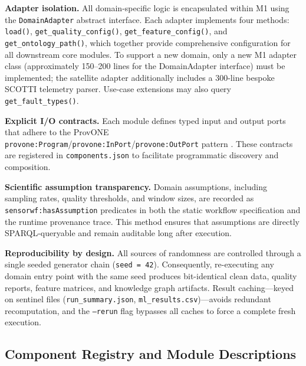 \documentclass[conference]{IEEEtran}
\begin{document}
\textbf{Adapter isolation.} All domain-specific logic is encapsulated within M1 using the \texttt{DomainAdapter} abstract interface. Each adapter implements four methods: \texttt{load()}, \texttt{get\_quality\_config()}, \texttt{get\_feature\_config()}, and \texttt{get\_ontology\_path()}, which together provide comprehensive configuration for all downstream core modules. To support a new domain, only a new M1 adapter class (approximately 150--200 lines for the DomainAdapter interface) must be implemented; the satellite adapter additionally includes a 300-line bespoke SCOTTI telemetry parser. Use-case extensions may also query \texttt{get\_fault\_types()}.

\textbf{Explicit I/O contracts.} Each module defines typed input and output ports that adhere to the ProvONE \texttt{provone:Program}/\texttt{provone:InPort}/\texttt{provone:OutPort} pattern \cite{missier2013provone}. These contracts are registered in \texttt{components.json} to facilitate programmatic discovery and composition.

\textbf{Scientific assumption transparency.} Domain assumptions, including sampling rates, quality thresholds, and window sizes, are recorded as \texttt{sensorwf:hasAssumption} predicates in both the static workflow specification and the runtime provenance trace. This method ensures that assumptions are directly SPARQL-queryable and remain auditable long after execution.

\textbf{Reproducibility by design.} All sources of randomness are controlled through a single seeded generator chain (\texttt{seed = 42}). Consequently, re-executing any domain entry point with the same seed produces bit-identical clean data, quality reports, feature matrices, and knowledge graph artifacts. Result caching---keyed on sentinel files (\texttt{run\_summary.json}, \texttt{ml\_results.csv})---avoids redundant recomputation, and the \texttt{--rerun} flag bypasses all caches to force a complete fresh execution.

\subsection{Component Registry and Module Descriptions}
\end{document}
